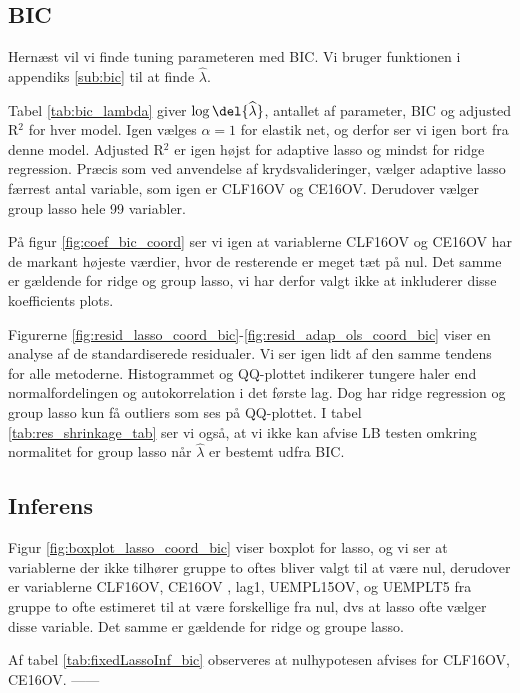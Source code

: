\subsection{BIC}
Hernæst vil vi finde tuning parameteren med BIC. 
Vi bruger funktionen i appendiks \ref{sub:bic} til at finde $\widehat{\lambda}$. 

Tabel \ref{tab:bic_lambda} giver $\log \del{ \widehat\lambda}$, antallet af parameter, BIC og adjusted R$^2$ for hver model. 
Igen vælges \(\alpha = 1\) for elastik net, og derfor ser vi igen bort fra denne model.
Adjusted R$^2$ er igen højst for adaptive lasso og mindst for ridge regression. 
Præcis som ved anvendelse af krydsvalideringer, vælger adaptive lasso færrest antal variable, som igen er \textcolor{blue3}{CLF16OV} og \textcolor{blue3}{CE16OV}.
Derudover vælger group lasso hele 99 variabler. 



På figur \ref{fig:coef_bic_coord} ser vi igen at variablerne \textcolor{blue3}{CLF16OV} og \textcolor{blue3}{CE16OV} har de markant højeste værdier, hvor de resterende er meget tæt på nul. 
Det samme er gældende for ridge og group lasso, vi har derfor valgt ikke at inkluderer disse koefficients plots. 


Figurerne \ref{fig:resid_lasso_coord_bic}-\ref{fig:resid_adap_ols_coord_bic} viser en analyse af de standardiserede residualer.
Vi ser igen lidt af den samme tendens for alle metoderne. 
Histogrammet og QQ-plottet indikerer tungere haler end normalfordelingen og autokorrelation i det første lag. 
Dog har ridge regression og group lasso kun få outliers som ses på QQ-plottet. 
I tabel \ref{tab:res_shrinkage_tab} ser vi også, at vi ikke kan afvise LB testen omkring normalitet for group lasso når $\widehat{\lambda}$ er bestemt udfra BIC. 

\newpage
\subsection*{Inferens}
Figur \ref{fig:boxplot_lasso_coord_bic} viser boxplot for lasso, og vi ser at variablerne der ikke tilhører gruppe to oftes bliver valgt til at være nul, derudover er variablerne  \textcolor{blue3}{CLF16OV},  \textcolor{blue3}{CE16OV} , \textcolor{blue3}{lag1}, \textcolor{blue3}{UEMPL15OV}, og \textcolor{blue3}{UEMPLT5} fra gruppe to ofte estimeret til at være forskellige fra nul, dvs at lasso ofte vælger disse variable. 
Det samme er gældende for ridge og groupe lasso. 

Af tabel \ref{tab:fixedLassoInf_bic} observeres at nulhypotesen afvises for \textcolor{blue3}{CLF16OV}, \textcolor{blue3}{CE16OV}. ------




